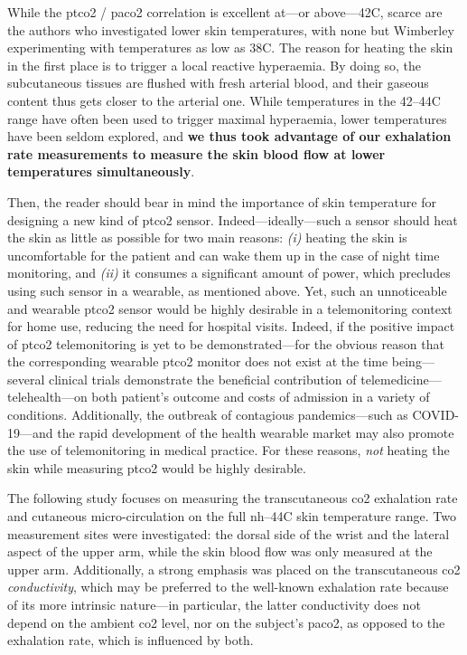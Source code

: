 While the \gls{ptco2} / \gls{paco2} correlation is excellent at---or above---42{\degree}C\cite{conway2018}, scarce are the authors who investigated lower skin temperatures, with none but Wimberley \etal{}\cite{wimberley1985a} experimenting with temperatures as low as 38{\degree}C. The reason for heating the skin in the first place is to trigger a local reactive hyperaemia\cite{roustit2012}. By doing so, the subcutaneous tissues are flushed with fresh arterial blood, and their gaseous content thus gets closer to the arterial one\cite{koch1965, rooth1987, zavorsky2007}. While temperatures in the 42--44{\degree}C range have often been used to trigger maximal hyperaemia, lower temperatures have been seldom explored\cite{hodges2016}, and \textbf{we thus took advantage of our exhalation rate measurements to measure the skin blood flow at lower temperatures simultaneously}.

Then, the reader should bear in mind the importance of skin temperature for designing a new kind of \gls{ptco2} sensor. Indeed---ideally---such a sensor should heat the skin as little as possible for two main reasons: \textit{(i)} heating the skin is uncomfortable for the patient and can wake them up in the case of night time monitoring, and \textit{(ii)} it consumes a significant amount of power, which precludes using such sensor in a wearable, as mentioned above. Yet, such an unnoticeable and wearable \gls{ptco2} sensor would be highly desirable in a telemonitoring context for home use, reducing the need for hospital visits. Indeed, if the positive impact of \gls{ptco2} telemonitoring is yet to be demonstrated---for the obvious reason that the corresponding wearable \gls{ptco2} monitor does not exist at the time being---several clinical trials demonstrate the beneficial contribution of telemedicine---\aka{} telehealth---on both patient's outcome and costs of admission in a variety of conditions\cite{steventon2012, kruse2019, yun2018}. Additionally, the outbreak of contagious pandemics---such as COVID-19\cite{garfan2021}---and the rapid development of the health wearable market\cite{dunn2018, yetisen2018, chung2019, dagher2020} may also promote the use of telemonitoring in medical practice. For these reasons, \emph{not} heating the skin while measuring \gls{ptco2} would be highly desirable.

The following study focuses on measuring the transcutaneous \gls{co2} exhalation rate and cutaneous micro-circulation on the full \gls{nh}--44{\degree}C skin temperature range. Two measurement sites were investigated: the dorsal side of the wrist and the lateral aspect of the upper arm, while the skin blood flow was only measured at the upper arm. Additionally, a strong emphasis was placed on the transcutaneous \gls{co2} \emph{conductivity}, which may be preferred to the well-known exhalation rate because of its more intrinsic nature---in particular, the latter conductivity does not depend on the ambient \gls{co2} level, nor on the subject's \gls{paco2}, as opposed to the exhalation rate, which is influenced by both.

